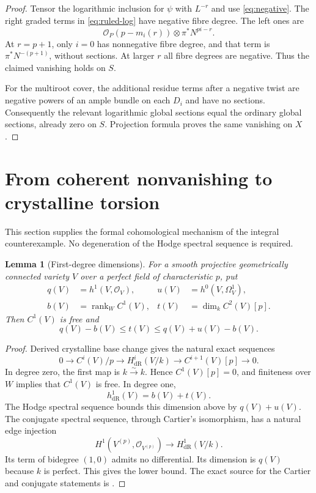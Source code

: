 \documentclass[11pt,a4paper]{article}
\newcommand{\OO}{\mathcal O}
\newcommand{\dR}{\mathrm{dR}}
\newcommand{\rank}{\operatorname{rank}}
\newtheorem{lemma}[theorem]{Lemma}
\theoremstyle{definition}\newtheorem{definition}[theorem]{Definition}
\theoremstyle{remark}\newtheorem{remark}[theorem]{Remark}
\numberwithin{equation}{section}
\begin{document}
\begin{proof}
Tensor the logarithmic inclusion for $\psi$ with $L^{-r}$ and use \eqref{eq:negative}. The right graded terms in \eqref{eq:ruled-log} have negative fibre degree. The left ones are
\[
 \OO_P(p-m_i(r))\otimes\pi^*N^{pi-r}.
\]
At $r=p+1$, only $i=0$ has nonnegative fibre degree, and that term is $\pi^*N^{-(p+1)}$, without sections. At larger $r$ all fibre degrees are negative. Thus the claimed vanishing holds on $S$.

For the multiroot cover, the additional residue terms after a negative twist are negative powers of an ample bundle on each $D_i$ and have no sections. Consequently the relevant logarithmic global sections equal the ordinary global sections, already zero on $S$. Projection formula proves the same vanishing on $X$.
\end{proof}

\section{From coherent nonvanishing to crystalline torsion}\label{sec:torsion}

This section supplies the formal cohomological mechanism of the integral counterexample. No degeneration of the Hodge spectral sequence is required.

\begin{lemma}[First-degree dimensions]\label{lem:torsion-bounds}
For a smooth projective geometrically connected variety $V$ over a perfect field of characteristic $p$, put
\[
 \begin{aligned}
 q(V)&=h^1(V,\OO_V),& u(V)&=h^0(V,\Omega_V^1),\\
 b(V)&=\rank_W C^1(V),& t(V)&=\dim_k C^2(V)[p].
 \end{aligned}
\]
Then $C^1(V)$ is free and
\begin{equation}\label{eq:torsion-bounds}
 q(V)-b(V)\le t(V)\le q(V)+u(V)-b(V).
\end{equation}
\end{lemma}
\begin{proof}
Derived crystalline base change gives the natural exact sequences
\begin{equation}\label{eq:uc}
 0\longrightarrow C^i(V)/p\longrightarrow H^i_{\dR}(V/k)
 \longrightarrow C^{i+1}(V)[p]\longrightarrow0.
\end{equation}
In degree zero, the first map is $k\xrightarrow{\sim}k$. Hence $C^1(V)[p]=0$, and finiteness over $W$ implies that $C^1(V)$ is free. In degree one,
\[
 h^1_{\dR}(V)=b(V)+t(V).
\]
The Hodge spectral sequence bounds this dimension above by $q(V)+u(V)$. The conjugate spectral sequence, through Cartier's isomorphism, has a natural edge injection
\[
 H^1(V^{(p)},\OO_{V^{(p)}})\longrightarrow H^1_{\dR}(V/k).
\]
Its term of bidegree $(1,0)$ admits no differential. Its dimension is $q(V)$ because $k$ is perfect. This gives the lower bound. The exact source for the Cartier and conjugate statements is \citet[0, Theorem 2.1.9, p.~515; II, \S6.14, p.~649]{Illusie}.
\end{proof}
\end{document}
